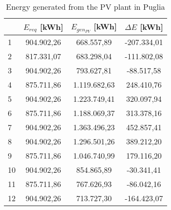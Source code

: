 \begin{table}[hp]
\centering
\begin{tabular}{|l|c|c|c|}
\hline
\rowcolor{bluepoli!40}\multicolumn{1}{|c|}{\textbf{Month}} & \textbf{$E_{req}$ [kWh]} & \textbf{$E_{gen_{PV}}$ [kWh]} & \textbf{$\Delta E$ [kWh]} \\ \hline
1     & 904.902,26                            & 668.557,89                         & -207.334,01                   \\ \hline
2     & 817.331,07                            & 683.298,04                         & -111.802,08                   \\ \hline
3     & 904.902,26                            & 793.627,81                         & -88.517,58                    \\ \hline
4     & 875.711,86                            & 1.119.682,63                       & 248.410,76                    \\ \hline
5     & 904.902,26                            & 1.223.749,41                       & 320.097,94                    \\ \hline
6     & 875.711,86                            & 1.188.069,37                       & 313.378,16                    \\ \hline
7     & 904.902,26                            & 1.363.496,23                       & 452.857,41                    \\ \hline
8     & 904.902,26                            & 1.296.501,26                       & 389.212,20                    \\ \hline
9     & 875.711,86                            & 1.046.740,99                       & 179.116,20                    \\ \hline
10    & 904.902,26                            & 854.865,89                         & -30.341,41                    \\ \hline
11    & 875.711,86                            & 767.626,93                         & -86.042,16                    \\ \hline
12    & 904.902,26                            & 713.727,30                         & -164.423,07                   \\ \hline
\end{tabular}
\caption{Energy generated from the PV plant in Puglia}
\label{tab:pvplantpuglia}
\end{table}